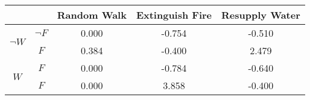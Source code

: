 \begin{center}
\begin{tabular}{|c|c|c|c|c|}
  \hline
  &   & Random Walk & Extinguish Fire & Resupply Water\\
  \hline
  \multirow{2}{*}{$\neg W$} & $\neg F$ & 0.000 & -0.754 & -0.510\\
  \cline{2-5}
   & $F$ & 0.384 & -0.400 & 2.479\\
  \hline
  \multirow{2}{*}{$W$} & $F$ & 0.000 & -0.784 & -0.640\\
  \cline{2-5}
   & $F$ & 0.000 & 3.858 & -0.400\\
  \hline
\end{tabular}
\end{center}
